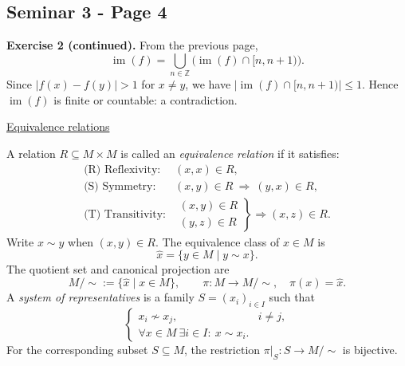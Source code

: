 
\subsection*{Seminar 3 - Page 4}
\begingroup
\setlength{\abovedisplayskip}{5pt}
\setlength{\belowdisplayskip}{5pt}
\setlength{\abovedisplayshortskip}{3pt}
\setlength{\belowdisplayshortskip}{3pt}

\noindent\textbf{Exercise 2 (continued).} From the previous page,
\[
 \operatorname{im}(f)=\bigcup_{n\in\mathbb Z}
 \bigl(\operatorname{im}(f)\cap[n,n+1)\bigr).
\]
Since $|f(x)-f(y)|>1$ for $x\neq y$, we have
$|\operatorname{im}(f)\cap[n,n+1)|\leq1$.
Hence $\operatorname{im}(f)$ is finite or countable: a contradiction.

\medskip
\noindent\underline{Equivalence relations}

\noindent A relation $R\subseteq M\times M$ is called an
\emph{equivalence relation} if it satisfies:
\[
\begin{array}{ll}
 \text{(R) Reflexivity:}&(x,x)\in R,\\[2pt]
 \text{(S) Symmetry:}&(x,y)\in R\ \Longrightarrow\ (y,x)\in R,\\[2pt]
 \text{(T) Transitivity:}&
  \left.\begin{array}{l}(x,y)\in R\\(y,z)\in R\end{array}\right\}
  \Longrightarrow (x,z)\in R.
\end{array}
\]
Write $x\sim y$ when $(x,y)\in R$. The equivalence class of
$x\in M$ is
\[
 \widehat{x}=\{y\in M\mid y\sim x\}.
\]
The quotient set and canonical projection are
\[
 M/{\sim}:=\{\widehat{x}\mid x\in M\},
 \qquad
 \pi:M\longrightarrow M/{\sim},
 \quad \pi(x)=\widehat{x}.
\]
\noindent 
\noindent A \emph{system of representatives} is a family
$S=(x_i)_{i\in I}$ such that
\[
 \begin{cases}
   x_i\not\sim x_j,&i\neq j,\\[2pt]
   \forall x\in M\ \exists i\in I:\ x\sim x_i.
 \end{cases}
\]
For the corresponding subset $S\subseteq M$, the restriction
$\pi|_S:S\to M/{\sim}$ is bijective.

